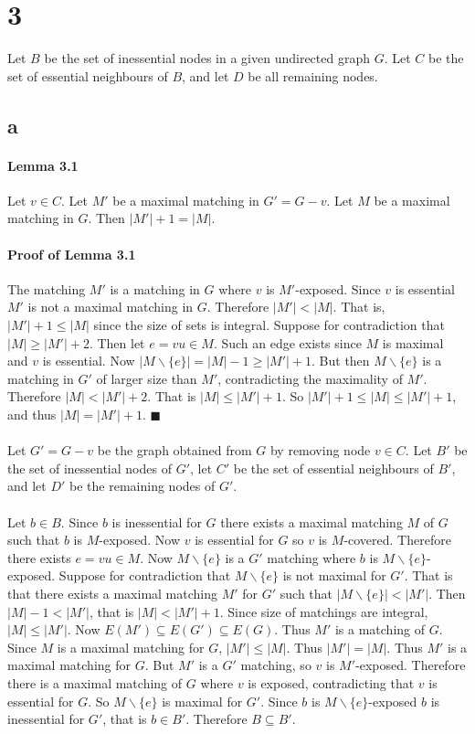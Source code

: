 \documentclass[letterpaper,12pt,oneside,onecolumn]{report}
\begin{document}
\section*{3}
Let $B$ be the set of inessential nodes in a given undirected graph $G$. Let $C$ be the set of essential neighbours of $B$, and let $D$ be all remaining nodes.
\subsection*{a}
\paragraph{Lemma 3.1}
Let $v \in C$. Let $M'$ be a maximal matching in $G' = G-v$. Let $M$ be a maximal matching in $G$. Then $|M'| + 1 = |M|$.
\paragraph{Proof of Lemma 3.1}
The matching $M'$ is a matching in $G$ where $v$ is $M'$-exposed. Since $v$ is essential $M'$ is not a maximal matching in $G$. Therefore $|M'| < |M|$. That is, $|M'| + 1 \leq |M|$ since the size of sets is integral. Suppose for contradiction that $|M| \geq |M'| + 2$. Then let $e=vu \in M$. Such an edge exists since $M$ is maximal and $v$ is essential. Now $|M\backslash\{e\}| = |M| - 1 \geq |M'| + 1$. But then $M\backslash\{e\}$ is a matching in $G'$ of larger size than $M'$, contradicting the maximality of $M'$. Therefore $|M| < |M'| +2$. That is $|M| \leq |M'| + 1$. So $|M'| + 1 \leq |M| \leq |M'|+1$, and thus $|M| = |M'| + 1$. $\blacksquare$
\paragraph{}
Let $G' = G-v$ be the graph obtained from $G$ by removing node $v \in C$. Let $B'$ be the set of inessential nodes of $G'$, let $C'$ be the set of essential neighbours of $B'$, and let $D'$ be the remaining nodes of $G'$.
\paragraph{}
Let $b \in B$. Since $b$ is inessential for $G$ there exists a maximal matching $M$ of $G$ such that $b$ is $M$-exposed. Now $v$ is essential for $G$ so $v$ is $M$-covered. Therefore there exists $e=vu \in M$. Now $M\backslash\{e\}$ is a $G'$ matching where $b$ is $M\backslash\{e\}$-exposed. Suppose for contradiction that $M\backslash\{e\}$ is not maximal for $G'$. That is that there exists a maximal matching $M'$ for $G'$ such that $|M\backslash\{e\}| < |M'|$. Then $|M| - 1 < |M'|$, that is $|M| < |M'| + 1$. Since size of matchings are integral, $|M| \leq |M'|$. Now $E(M') \subseteq E(G') \subseteq E(G)$. Thus $M'$ is a matching of $G$. Since $M$ is a maximal matching for $G$, $|M'| \leq |M|$. Thus $|M'| = |M|$. Thus $M'$ is a maximal matching for $G$. But $M'$ is a $G'$ matching, so $v$ is $M'$-exposed. Therefore there is a maximal matching of $G$ where $v$ is exposed, contradicting that $v$ is essential for $G$. So $M\backslash\{e\}$ is maximal for $G'$. Since $b$ is $M\backslash\{e\}$-exposed $b$ is inessential for $G'$, that is $b \in B'$. Therefore $B \subseteq B'$. 
\end{document}
